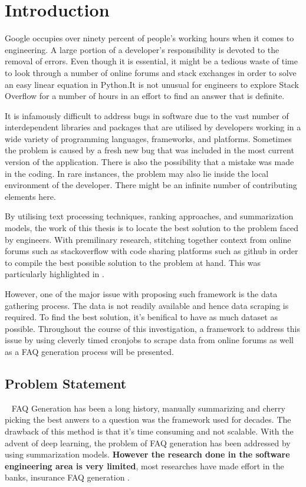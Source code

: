 \chapter{Introduction}
Google occupies over ninety percent of people's working hours when it comes to engineering. A large portion of a developer's responsibility is devoted to the removal of errors. Even though it is essential, it might be a tedious waste of time to look through a number of online forums and stack exchanges in order to solve an easy linear equation in Python\cite{bugs_nightmare}.It is not unusual for engineers to explore Stack Overflow for a number of hours in an effort to find an answer that is definite.

It is infamously difficult to address bugs in software due to the vast number of interdependent libraries and packages that are utilised by developers working in a wide variety of programming languages, frameworks, and platforms. Sometimes the problem is caused by a fresh new bug that was included in the most current version of the application. There is also the possibility that a mistake was made in the coding. In rare instances, the problem may also lie inside the local environment of the developer. There might be an infinite number of contributing elements here.

By utilising text processing techniques, ranking approaches, and summarization models, the work of this thesis is to locate the best solution to the problem faced by engineers. With premilinary research, stitching together context from online forums such as stackoverflow with code sharing platforms such as github in order to compile the best possible solution to the problem at hand. This was particularly highlighted in \cite{8816796}. 

However, one of the major issue with proposing such framework is the data gathering process. The data is not readily available and hence data scraping is required. To find the best solution, it's benifical to have as much dataset as possible. Throughout the course of this investigation, a framework to address this issue by using cleverly timed cronjobs to scrape data from online forums as well as a FAQ generation process will be presented.

\vspace{1cm}
\pagebreak
\section{Problem Statement}~\label{ch:problem_statement}
FAQ Generation has been a long history, manually summarizing and cherry picking the best anwers to a question was the framework used for decades. The drawback of this method is that it's time consuming and not scalable\cite{}. With the advent of deep learning, the problem of FAQ generation has been addressed by using summarization models. \textbf{However the research done in the software engineering area is very limited}, most researches have made effort in the banks, insurance FAQ generation \cite{}. 

